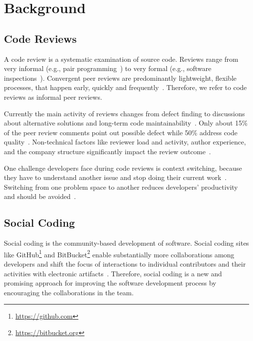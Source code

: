 
\section{Background}
\subsection{Code Reviews}
A code review is a systematic examination of source code. 
%
Reviews range from very informal (e.g., pair programming~\cite{beck2000extreme}) to very formal (e.g., software inspections~\cite{fagan2001design, ackerman1989software}). 
%
Convergent peer reviews are predominantly lightweight, flexible processes, that happen early, quickly and frequently~\cite{rigby2013PeerCodeReviews, shimagaki2016CRInSony, rigby2012contemporary, rigby2014PeerReviewOSS}. 
%
Therefore, we refer to code reviews as informal peer reviews.
%

%
Currently the main activity of reviews changes from defect finding to discussions about alternative solutions and long-term code maintainability~\cite{rigby2013PeerCodeReviews, czerwonka2015codereviews}.
%
Only about 15\% of the peer review comments point out possible defect while 50\% address code quality~\cite{czerwonka2015codereviews}.
%
Non-technical factors like reviewer load and activity, author experience, and the company structure significantly impact the review outcome~\cite{baysal2013influence, baysal2016investigating}.

%
One challenge developers face during code reviews is context switching, because they have to understand another issue and stop doing their current work~\cite{czerwonka2015codereviews, kononenko2016codereviewquality}.
%
Switching from one problem space to another reduces developers' productivity and should be avoided~\cite{poppendieck2003lean}. 

\subsection{Social Coding}
Social coding is the community-based development of software.
%
Social coding sites like GitHub\footnote{\url{https://github.com}} and BitBucket\footnote{\url{https://bitbucket.org}} enable substantially more collaborations among developers \cite{thung2013github} and shift the focus of interactions to individual contributors and their activities with electronic artifacts~\cite{dabbish2012social, storey2012msr}.
%
Therefore, social coding is a new and promising approach for improving the software development process by encouraging the collaborations in the team.
